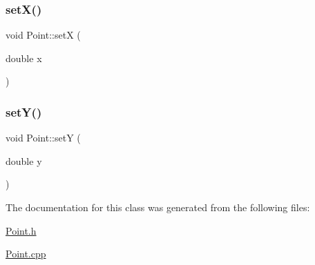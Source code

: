 \mbox{\label{classPoint_a9aa66c310860d038cb1258dc5cd80906}} 
\subsubsection{\texorpdfstring{set\+X()}{setX()}}
{\footnotesize\ttfamily void Point\+::setX (\begin{DoxyParamCaption}\item[{double}]{x }\end{DoxyParamCaption})}

\mbox{\label{classPoint_a7d1ee63237f361d41e697f87c3cb051d}} 
\subsubsection{\texorpdfstring{set\+Y()}{setY()}}
{\footnotesize\ttfamily void Point\+::setY (\begin{DoxyParamCaption}\item[{double}]{y }\end{DoxyParamCaption})}



The documentation for this class was generated from the following files\+:\begin{DoxyCompactItemize}
\item 
\hyperlink{Point_8h}{Point.\+h}\item 
\hyperlink{Point_8cpp}{Point.\+cpp}\end{DoxyCompactItemize}
